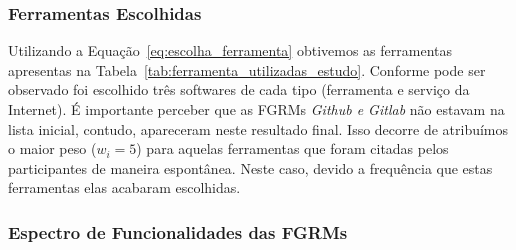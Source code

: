 \subsubsection{Ferramentas Escolhidas}
\label{subsec:resultados_ferramentas_escolhidas}

Utilizando a Equação~\ref{eq:escolha_ferramenta} obtivemos as ferramentas
apresentas na Tabela~\ref{tab:ferramenta_utilizadas_estudo}. Conforme pode ser
observado foi escolhido três softwares de cada tipo (ferramenta e serviço da
Internet). É importante perceber que as FGRMs \textit{Github e Gitlab} não
estavam na lista inicial, contudo, apareceram neste resultado final. Isso
decorre  de atribuímos o maior peso ($w_i = 5$) para aquelas ferramentas que
foram citadas pelos participantes de maneira espontânea.  Neste caso, devido a
frequência que estas ferramentas elas acabaram escolhidas.

\begin{table}[htpb]
\centering
{}
\caption{Ferramentas utilizados no estudo}
\label{tab:ferramenta_utilizadas_estudo}
\end{table}


\subsubsection{Espectro de Funcionalidades das FGRMs}
\label{subsec:categorizacao_ferramentas}


